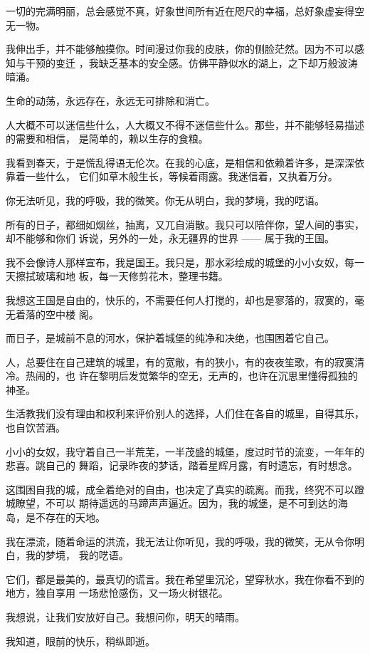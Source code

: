 \documentclass[12pt,a4paper]{article}
\begin{document}
		一切的完满明丽，总会感觉不真，好象世间所有近在咫尺的幸福，总好象虚妄得空无一物。

		我伸出手，并不能够触摸你。时间漫过你我的皮肤，你的侧脸茫然。因为不可以感知与干预的变迁
	，我缺乏基本的安全感。仿佛平静似水的湖上，之下却万般波涛暗涌。

		生命的动荡，永远存在，永远无可排除和消亡。

		人大概不可以迷信些什么，人大概又不得不迷信些什么。那些，并不能够轻易描述的需要和相信，
	是简单的，赖以生存的食粮。

		我看到春天，于是慌乱得语无伦次。在我的心底，是相信和依赖着许多，是深深依靠着一些什么，
	它们如草木般生长，等候着雨露。我迷信着，又执着万分。


		你无法听见，我的呼吸，我的微笑。你无从明白，我的梦境，我的呓语。

		所有的日子，都细如烟丝，抽离，又兀自消散。我只可以陪伴你，望人间的事实，却不能够和你们
	诉说，另外的一处，永无疆界的世界 —— 属于我的王国。

		我不会像诗人那样宣布，我是国王。我只是，那水彩绘成的城堡的小小女奴，每一天擦拭玻璃和地
	板，每一天修剪花木，整理书籍。

		我想这王国是自由的，快乐的，不需要任何人打搅的，却也是寥落的，寂寞的，毫无着落的空中楼
	阁。

		而日子，是城前不息的河水，保护着城堡的纯净和决绝，也围困着它自己。

		人，总要住在自己建筑的城里，有的宽敞，有的狭小，有的夜夜笙歌，有的寂寞清冷。热闹的，也
	许在黎明后发觉繁华的空无，无声的，也许在沉思里懂得孤独的神圣。

		生活教我们没有理由和权利来评价别人的选择，人们住在各自的城里，自得其乐，也自饮苦酒。

		小小的女奴，我守着自己一半荒芜，一半茂盛的城堡，度过时节的流变，一年年的悲喜。跳自己的
	舞蹈，记录昨夜的梦话，踏着星辉月露，有时遗忘，有时想念。

		这围困自我的城，成全着绝对的自由，也决定了真实的疏离。而我，终究不可以蹬城瞭望，不可以
	期待遥远的马蹄声声逼近。因为，我的城堡，是不可到达的海岛，是不存在的天地。

		我在漂流，随着命运的洪流，我无法让你听见，我的呼吸，我的微笑，无从令你明白，我的梦境，
	我的呓语。

		它们，都是最美的，最真切的谎言。我在希望里沉沦，望穿秋水，我在你看不到的地方，独自享用
	一场悲怆感伤，又一场火树银花。

		我想说，让我们安放好自己。我想问你，明天的晴雨。

		我知道，眼前的快乐，稍纵即逝。
\end{document}

